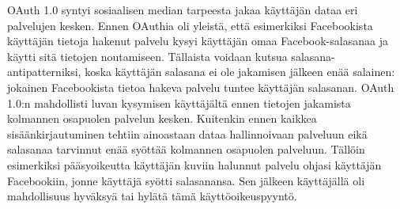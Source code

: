 \documentclass[finnish,gradu]{tktltiki}
\begin{document}





  OAuth 1.0 syntyi sosiaalisen median tarpeesta jakaa käyttäjän dataa eri palvelujen kesken. Ennen OAuthia oli yleistä, että esimerkiksi Facebookista käyttäjän tietoja hakenut palvelu kysyi käyttäjän omaa Facebook-salasanaa ja käytti sitä tietojen noutamiseen. Tällaista voidaan kutsua salasana-antipatterniksi, koska käyttäjän salasana ei ole jakamisen jälkeen enää salainen: jokainen Facebookista tietoa hakeva palvelu tuntee käyttäjän salasanan. OAuth 1.0:n mahdollisti luvan kysymisen käyttäjältä ennen tietojen jakamista kolmannen osapuolen palvelun kesken. Kuitenkin ennen kaikkea sisäänkirjautuminen tehtiin ainoastaan dataa hallinnoivaan palveluun eikä salasanaa tarvinnut enää syöttää kolmannen osapuolen palveluun. Tällöin esimerkiksi pääsyoikeutta käyttäjän kuviin halunnut palvelu ohjasi käyttäjän Facebookiin, jonne käyttäjä syötti salasanansa. Sen jälkeen käyttäjällä oli mahdollisuus hyväksyä tai hylätä tämä käyttöoikeuspyyntö.
\end{document}
